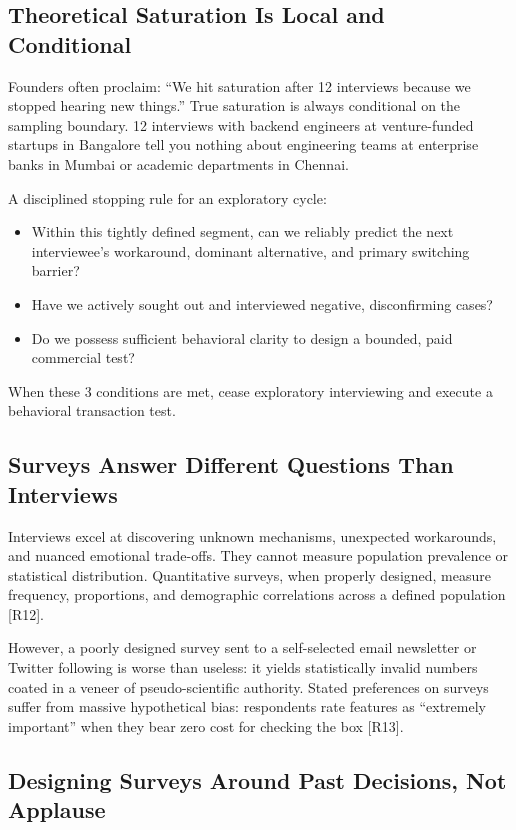 \subsection{Theoretical Saturation Is Local and Conditional}

Founders often proclaim: ``We hit saturation after 12 interviews because we stopped hearing new things.'' True saturation is always conditional on the sampling boundary. 12 interviews with backend engineers at venture-funded startups in Bangalore tell you nothing about engineering teams at enterprise banks in Mumbai or academic departments in Chennai.

A disciplined stopping rule for an exploratory cycle:
\begin{itemize}[leftmargin=1.2em,itemsep=0.2ex]
  \item Within this tightly defined segment, can we reliably predict the next interviewee's workaround, dominant alternative, and primary switching barrier?
  \item Have we actively sought out and interviewed negative, disconfirming cases?
  \item Do we possess sufficient behavioral clarity to design a bounded, paid commercial test?
\end{itemize}
When these 3 conditions are met, cease exploratory interviewing and execute a behavioral transaction test.

\subsection{Surveys Answer Different Questions Than Interviews}

Interviews excel at discovering unknown mechanisms, unexpected workarounds, and nuanced emotional trade-offs. They cannot measure population prevalence or statistical distribution. Quantitative surveys, when properly designed, measure frequency, proportions, and demographic correlations across a defined population [R12].

However, a poorly designed survey sent to a self-selected email newsletter or Twitter following is worse than useless: it yields statistically invalid numbers coated in a veneer of pseudo-scientific authority. Stated preferences on surveys suffer from massive hypothetical bias: respondents rate features as ``extremely important'' when they bear zero cost for checking the box [R13].

\subsection{Designing Surveys Around Past Decisions, Not Applause}

